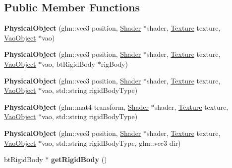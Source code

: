 \subsection*{Public Member Functions}
\begin{DoxyCompactItemize}
\item 
\mbox{\label{class_physical_object_aee54168bb54a6b9c3d340c9f818a7b53}} 
{\bfseries Physical\+Object} (glm\+::vec3 position, \hyperlink{class_shader}{Shader} $\ast$shader, \hyperlink{class_texture}{Texture} texture, \hyperlink{class_vao_object}{Vao\+Object} $\ast$vao)
\item 
\mbox{\label{class_physical_object_a3e3f19518fbd261817e42c5a78fb543d}} 
{\bfseries Physical\+Object} (glm\+::vec3 position, \hyperlink{class_shader}{Shader} $\ast$shader, \hyperlink{class_texture}{Texture} texture, \hyperlink{class_vao_object}{Vao\+Object} $\ast$vao, bt\+Rigid\+Body $\ast$rig\+Body)
\item 
\mbox{\label{class_physical_object_af216654d65cdf55b16f1f9da03572dee}} 
{\bfseries Physical\+Object} (glm\+::vec3 position, \hyperlink{class_shader}{Shader} $\ast$shader, \hyperlink{class_texture}{Texture} texture, \hyperlink{class_vao_object}{Vao\+Object} $\ast$vao, std\+::string rigid\+Body\+Type)
\item 
\mbox{\label{class_physical_object_a8e21f75621841ccd58a7cc757fb1c445}} 
{\bfseries Physical\+Object} (glm\+::mat4 transform, \hyperlink{class_shader}{Shader} $\ast$shader, \hyperlink{class_texture}{Texture} texture, \hyperlink{class_vao_object}{Vao\+Object} $\ast$vao, std\+::string rigid\+Body\+Type)
\item 
\mbox{\label{class_physical_object_a729b7781a7f7de8dd076f28cca54742f}} 
{\bfseries Physical\+Object} (glm\+::vec3 position, \hyperlink{class_shader}{Shader} $\ast$shader, \hyperlink{class_texture}{Texture} texture, \hyperlink{class_vao_object}{Vao\+Object} $\ast$vao, std\+::string rigid\+Body\+Type, glm\+::vec3 dir)
\item 
\mbox{\label{class_physical_object_a99886c0d01149e4ab04d9f7598f391db}} 
bt\+Rigid\+Body $\ast$ {\bfseries get\+Rigid\+Body} ()
\item 

\end{DoxyCompactItemize}

